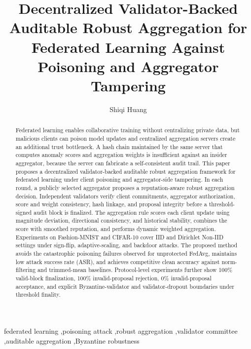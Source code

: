 \documentclass[preprint,authoryear,12pt]{elsarticle}
\begin{document}
\begin{frontmatter}

\title{Decentralized Validator-Backed Auditable Robust Aggregation for Federated Learning Against Poisoning and Aggregator Tampering}

\author[aff1]{Shiqi Huang}
\address[aff1]{Faculty of Computational Mathematics and Cybernetics, Lomonosov Moscow State University, Moscow, Russia}

\begin{abstract}
Federated learning enables collaborative training without centralizing private data, but malicious clients can poison model updates and centralized aggregation servers create an additional trust bottleneck. A hash chain maintained by the same server that computes anomaly scores and aggregation weights is insufficient against an insider aggregator, because the server can fabricate a self-consistent audit trail. This paper proposes a decentralized validator-backed auditable robust aggregation framework for federated learning under client poisoning and aggregator-side tampering. In each round, a publicly selected aggregator proposes a reputation-aware robust aggregation decision. Independent validators verify client commitments, aggregator authorization, score and weight consistency, hash linkage, and proposal integrity before a threshold-signed audit block is finalized. The aggregation rule scores each client update using magnitude deviation, directional consistency, and historical stability, combines the score with smoothed reputation, and performs dynamic weighted aggregation. Experiments on Fashion-MNIST and CIFAR-10 cover IID and Dirichlet Non-IID settings under sign-flip, adaptive-scaling, and backdoor attacks. The proposed method avoids the catastrophic poisoning failures observed for unprotected FedAvg, maintains low attack success rate (ASR), and achieves competitive clean accuracy against norm-filtering and trimmed-mean baselines. Protocol-level experiments further show 100\% valid-block finalization, 100\% invalid-proposal rejection, 0\% invalid-proposal acceptance, and explicit Byzantine-validator and validator-dropout boundaries under threshold finality.
\end{abstract}

\begin{keyword}
federated learning \sep poisoning attack \sep robust aggregation \sep validator committee \sep auditable aggregation \sep Byzantine robustness
\end{keyword}

\end{frontmatter}
\end{document}
